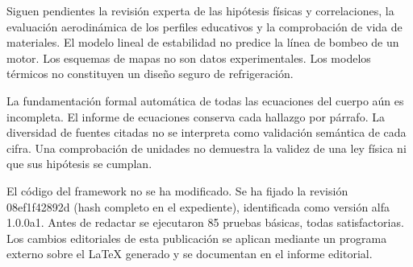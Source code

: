 \documentclass[10pt,openany]{book}
\begin{document}
Siguen pendientes la revisión experta de las hipótesis físicas y correlaciones, la evaluación aerodinámica de los perfiles educativos y la comprobación de vida de materiales. El modelo lineal de estabilidad no predice la línea de bombeo de un motor. Los esquemas de mapas no son datos experimentales. Los modelos térmicos no constituyen un diseño seguro de refrigeración.

La fundamentación formal automática de todas las ecuaciones del cuerpo aún es incompleta. El informe de ecuaciones conserva cada hallazgo por párrafo. La diversidad de fuentes citadas no se interpreta como validación semántica de cada cifra. Una comprobación de unidades no demuestra la validez de una ley física ni que sus hipótesis se cumplan.

El código del framework no se ha modificado. Se ha fijado la revisión 08ef1f42892d (hash completo en el expediente), identificada como versión alfa 1.0.0a1. Antes de redactar se ejecutaron 85 pruebas básicas, todas satisfactorias. Los cambios editoriales de esta publicación se aplican mediante un programa externo sobre el LaTeX generado y se documentan en el informe editorial.
\end{document}

